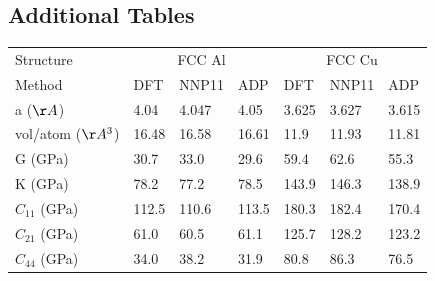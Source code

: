 \documentclass{article}
\begin{document}
\subsection{Additional Tables}
\begin{tabular}{l|lll|lll}%
\hline%
Structure&\multicolumn{3}{c}{FCC Al}&\multicolumn{3}{c}{FCC Cu}\\%
Method&DFT&NNP11&ADP&DFT&NNP11&ADP\\%
\hline%
a ($\AA$)&4.04&4.047&4.05&3.625&3.627&3.615\\%
vol/atom ($\AA^3$)&16.48&16.58&16.61&11.9&11.93&11.81\\%
G (GPa)&30.7&33.0&29.6&59.4&62.6&55.3\\%
K (GPa)&78.2&77.2&78.5&143.9&146.3&138.9\\%
$C_{11}$ (GPa)&112.5&110.6&113.5&180.3&182.4&170.4\\%
$C_{21}$ (GPa)&61.0&60.5&61.1&125.7&128.2&123.2\\%
$C_{44}$ (GPa)&34.0&38.2&31.9&80.8&86.3&76.5\\%
\hline%
\end{tabular}%
\newline%
\newline%
\newline%
\newline%
\end{document}
